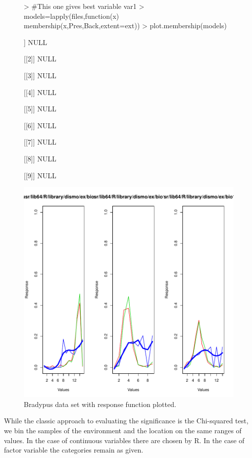 \documentclass{article}
\begin{document}
\begin{figure}[htbp]
\begin{center}
\begin{Schunk}
\begin{Sinput}
> #This one gives best variable var1
> models=lapply(files,function(x) membership(x,Pres,Back,extent=ext))
> plot.membership(models)
\end{Sinput}
\begin{Soutput}
[[1]]
NULL

[[2]]
NULL

[[3]]
NULL

[[4]]
NULL

[[5]]
NULL

[[6]]
NULL

[[7]]
NULL

[[8]]
NULL

[[9]]
NULL
\end{Soutput}
\end{Schunk}
\includegraphics{article-003}
\caption{\label{fig:ts} Bradypus data set with response function plotted.}
\end{center}
\end{figure} 


While the classic approach to evaluating the significance is the Chi-squared test, we bin the samples of the environment and the location on the same ranges of values.  In the case of continuous variables there are chosen by R.  In the case of factor variable the categories remain as given. 
\end{document}
